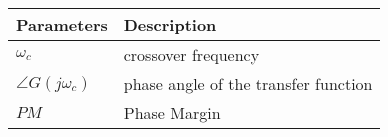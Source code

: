\begin{tabular}{|p{1.5cm}|p{5.75cm}|}
\hline
\textbf{Parameters} & \textbf{Description} \\
\hline
$\omega_c$ & crossover frequency \\
\hline
$\angle G(j\omega_c)$ & phase angle of the transfer function \\
\hline
$PM$ & Phase Margin\\
\hline
\end{tabular}
